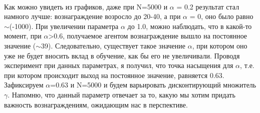 \documentclass[a4paper]{report}
\theoremstyle{definition}
\theoremstyle{plain}
\theoremstyle{remark}
\theoremstyle{remark}
\theoremstyle{definition}
\begin{document}
\\
Как можно увидеть из графиков, даже при N=5000 и $\alpha$ = 0.2 результат стал намного лучше: вознаграждение возросло до 20-40, а при $\alpha$ = 0, оно было равно $\sim$(-1000). При увеличении параметра $\alpha$ до 1.0, можно наблюдать, что в какой-то момент, при $\alpha$>0.6, получаемое агентом вознаграждение вышло на постоянное значение ($\sim$39). Следовательно, существует такое значение $\alpha$, при котором оно уже не будет вносить вклад в обучение, как бы его не увеличивали. Проводя эксперимент при данных параметрах, я получил, что точка насыщения для $\alpha$, т.е. при котором происходит выход на постоянное значение, равняется 0.63.
\\
Зафиксируем $\alpha$=0.63 и N=5000 и будем варьировать дисконтирующий множитель $\gamma$. Напомню, что данный параметр отвечает за то, какую мы хотим придать важность вознаграждениям, ожидающим нас в перспективе.
\end{document}
